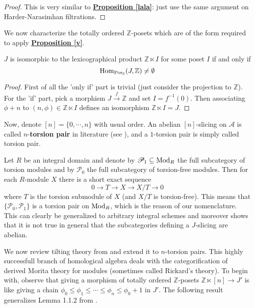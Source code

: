 \begin{proof}
This is very similar to \hyperref[lala]{\textbf{Proposition \ref*{lala}}}: just use the same argument on Harder-Narasimhan filtrations.
\end{proof}

We now characterize the totally ordered $\mathbb{Z}$-posets which are of the form required to apply \hyperref[v]{\textbf{Proposition \ref*{v}}}. \\

\begin{prop}\label{fot}
$J$ is isomorphic to the lexicographical product $\mathbb{Z} \ltimes I$ for some poset $I$ if and only if $$\textnormal{Hom}_{\textnormal{Pos}_{\mathbb{Z}}}(J,\mathbb{Z}) \not = \emptyset $$
\end{prop}

\begin{proof}
First of all the 'only if' part is trivial (just consider the projection to $\mathbb{Z}$). For the 'if' part, pick a morphism $J \overset{f}{\longrightarrow} \mathbb{Z}$ and set $I= f^{-1}(0)$. Then associating $\phi + n$ to $(n, \phi) \in \mathbb{Z} \ltimes I$ defines an isomorphism $\mathbb{Z} \ltimes I = J$. 
\end{proof}

Now, denote $[n]=\{0,\cdots,n\}$ with usual order. An abelian $[n]$-slicing on $\mathscr{A}$ is called $n$-\textbf{torsion pair} in literature (see \cite{kong}), and a $1$-torsion pair is simply called torsion pair. \\

\begin{exmp}\label{torgeo}
Let $R$ be an integral domain and denote by $\mathscr{P}_1 \subseteq \textnormal{Mod}_R$ the full subcategory of torsion modules and by $\mathscr{P}_0$ the full subcategory of torsion-free modules. Then for each $R$-module $X$ there is a short exact sequence $$0 \longrightarrow T \longrightarrow X \longrightarrow X/T \longrightarrow 0$$ 
where $T$ is the torsion submodule of $X$ (and $X/T$ is torsion-free). This means that $\{ \mathscr{P}_0, \mathscr{P}_1 \}$ is a torsion pair on $\textnormal{Mod}_R$, which is the reason of our nomenclature. This can clearly be generalized to arbitrary integral schemes and moreover shows that it is not true in general that the subcategories defining a $J$-slicing are abelian.
\end{exmp}

We now review tilting theory from \cite{hrs} and extend it to $n$-torsion pairs. This highly successfull branch of homological algebra deals with the categorification of derived Morita theory for modules (sometimes called Rickard's theory). To begin with, observe that giving a morphism of totally ordered $\mathbb{Z}$-posets $\mathbb{Z} \ltimes [n] \longrightarrow J'$ is like giving a chain $\phi_0 \le \phi_1 \le \cdots \le \phi_n \le \phi_0+1$ in $J'$. The following result generalizes Lemma 1.1.2 from \cite{pol}. 

